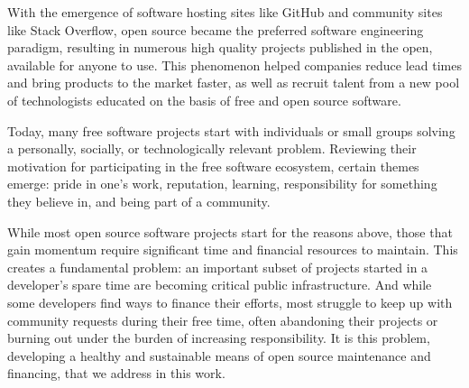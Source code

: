 With the emergence of software hosting sites like GitHub and community sites
like Stack Overflow, open source became the preferred software engineering
paradigm, resulting in numerous high quality projects published in the open,
available for anyone to use. This phenomenon helped
companies reduce lead times and bring products to the market faster, as well as
recruit talent from a new pool of technologists educated on the basis of
free and open source software.

Today, many free software projects start with individuals or small groups
solving a personally, socially, or technologically relevant problem.
Reviewing their motivation for participating in the free software ecosystem,
certain themes emerge: pride in one's work, reputation, learning,
responsibility for something they believe in, and being part of a community.

While most open source software projects start for the reasons above, those
that gain momentum require significant time and financial resources to
maintain. This creates a fundamental problem: an important subset of projects
started in a developer's spare time are becoming critical public
infrastructure. And while some developers find ways to finance their efforts,
most struggle to keep up with community requests during their free time, often
abandoning their projects or burning out under the burden of increasing
responsibility. It is this problem, developing a healthy and sustainable means
of open source maintenance and financing, that we address in this work.
